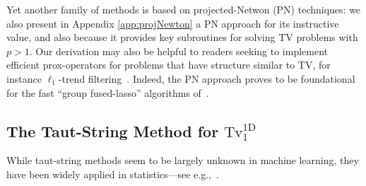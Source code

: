 \documentclass[twoside,11pt]{article}
\newcommand{\tvell}{\text{Tv}}
\newcommand{\oned}{\text{1D}}
\numberwithin{equation}{section}
\numberwithin{theorem}{section}
\begin{document}
Yet another family of methods is based on projected-Netwon (PN) techniques: we also present in Appendix \ref{app:projNewton} a PN approach for its instructive value, and also because it provides key subroutines for solving TV problems with $p > 1$. Our derivation may also be helpful to readers seeking to implement efficient prox-operators for problems that have structure similar to TV, for instance $\ell_1$-trend filtering~\citep{boyd.kim,trendf}. Indeed, the PN approach proves to be foundational for the fast ``group fused-lasso'' algorithms of~\citep{wytock}.

\subsection{The Taut-String Method for $\tvell_1^{\oned}$}
While taut-string methods seem to be largely unknown in machine learning, they have been widely applied in statistics---see e.g.,~\citep{grasmairTV07,daviesTautString,Barlow}.
\end{document}
